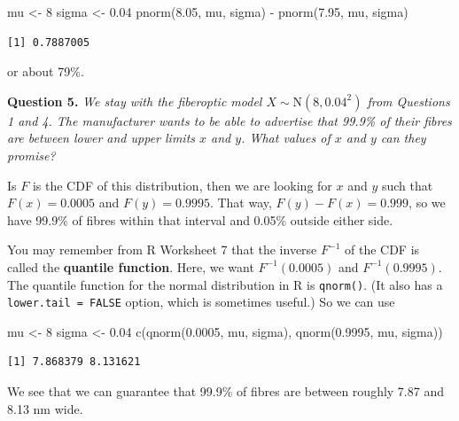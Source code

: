 \documentclass[
  letterpaper,
  DIV=11,
  numbers=noendperiod]{scrreprt}
\newenvironment{Shaded}{\begin{snugshade}}{\end{snugshade}}
\newcommand{\DecValTok}[1]{\textcolor[rgb]{0.68,0.00,0.00}{#1}}
\newcommand{\FloatTok}[1]{\textcolor[rgb]{0.68,0.00,0.00}{#1}}
\newcommand{\FunctionTok}[1]{\textcolor[rgb]{0.28,0.35,0.67}{#1}}
\newcommand{\NormalTok}[1]{\textcolor[rgb]{0.00,0.23,0.31}{#1}}
\newcommand{\OtherTok}[1]{\textcolor[rgb]{0.00,0.23,0.31}{#1}}
\newcommand{\SpecialCharTok}[1]{\textcolor[rgb]{0.37,0.37,0.37}{#1}}
\theoremstyle{remark}
\begin{document}
\begin{Shaded}
\begin{Highlighting}[]
\NormalTok{mu }\OtherTok{\textless{}{-}} \DecValTok{8}
\NormalTok{sigma }\OtherTok{\textless{}{-}} \FloatTok{0.04}
\FunctionTok{pnorm}\NormalTok{(}\FloatTok{8.05}\NormalTok{, mu, sigma) }\SpecialCharTok{{-}} \FunctionTok{pnorm}\NormalTok{(}\FloatTok{7.95}\NormalTok{, mu, sigma)}
\end{Highlighting}
\end{Shaded}

\begin{verbatim}
[1] 0.7887005
\end{verbatim}

or about 79\%.

\textbf{Question 5.} \emph{We stay with the fiberoptic model
\(X \sim \mathrm{N}(8, 0.04^2)\) from Questions 1 and 4. The
manufacturer wants to be able to advertise that 99.9\% of their fibres
are between lower and upper limits \(x\) and \(y\). What values of \(x\)
and \(y\) can they promise?}

Is \(F\) is the CDF of this distribution, then we are looking for \(x\)
and \(y\) such that \(F(x) = 0.0005\) and \(F(y) = 0.9995\). That way,
\(F(y) - F(x) = 0.999\), so we have 99.9\% of fibres within that
interval and 0.05\% outside either side.

You may remember from R Worksheet 7 that the inverse \(F^{-1}\) of the
CDF is called the \textbf{quantile function}. Here, we want
\(F^{-1}(0.0005)\) and \(F^{-1}(0.9995)\). The quantile function for the
normal distribution in R is \texttt{qnorm()}. (It also has a
\texttt{lower.tail\ =\ FALSE} option, which is sometimes useful.) So we
can use

\begin{Shaded}
\begin{Highlighting}[]
\NormalTok{mu }\OtherTok{\textless{}{-}} \DecValTok{8}
\NormalTok{sigma }\OtherTok{\textless{}{-}} \FloatTok{0.04}
\FunctionTok{c}\NormalTok{(}\FunctionTok{qnorm}\NormalTok{(}\FloatTok{0.0005}\NormalTok{, mu, sigma), }\FunctionTok{qnorm}\NormalTok{(}\FloatTok{0.9995}\NormalTok{, mu, sigma))}
\end{Highlighting}
\end{Shaded}

\begin{verbatim}
[1] 7.868379 8.131621
\end{verbatim}

We see that we can guarantee that 99.9\% of fibres are between roughly
7.87 and 8.13 nm wide.
\end{document}
